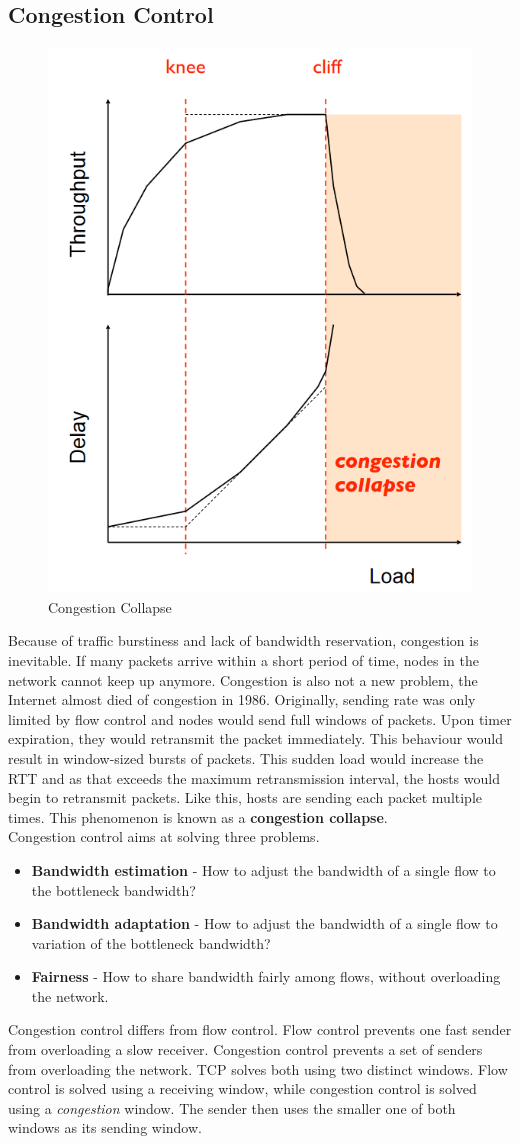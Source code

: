 \subsection{Congestion Control}
\begin{figure}
\centering
\includegraphics[width=.4\textwidth]{images/congestion_collapse.PNG}
\caption{Congestion Collapse}
\label{congestion_collapse}
\end{figure}
Because of traffic burstiness and lack of bandwidth reservation, congestion is inevitable. If many packets arrive within a short period of time, nodes in the network cannot keep up anymore. Congestion is also not a new problem, the Internet almost died of congestion in 1986. Originally, sending rate was only limited by flow control and nodes would send full windows of packets. Upon timer expiration, they would retransmit the packet immediately. This behaviour would result in window-sized bursts of packets. This sudden load would increase the RTT and as that exceeds the maximum retransmission interval, the hosts would begin to retransmit packets. Like this, hosts are sending each packet multiple times. This phenomenon is known as a \textbf{congestion collapse}. \vspace{.3cm}\\
Congestion control aims at solving three problems.
\begin{itemize}
\item \textbf{Bandwidth estimation} - How to adjust the bandwidth of a single flow to the bottleneck bandwidth?
\item \textbf{Bandwidth adaptation} - How to adjust the bandwidth of a single flow to variation of the bottleneck bandwidth?
\item \textbf{Fairness} - How to share bandwidth fairly among flows, without overloading the network.
\end{itemize}
Congestion control differs from flow control. Flow control prevents one fast sender from overloading a slow receiver. Congestion control prevents a set of senders from overloading the network. TCP solves both using two distinct windows. Flow control is solved using a receiving window, while congestion control is solved using a \textit{congestion} window. The sender then uses the smaller one of both windows as its sending window.

